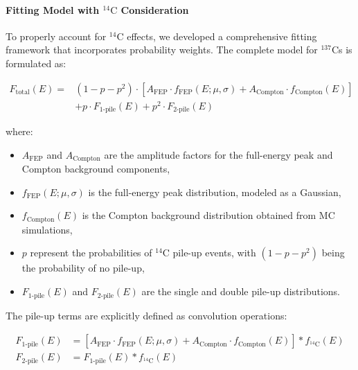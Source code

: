 \paragraph{Fitting Model with $^{14}\text{C}$ Consideration}
To properly account for $^{14}\text{C}$ effects, we developed a comprehensive fitting framework that incorporates probability weights. The complete model for $^{137}$Cs is formulated as:

\begin{equation}
\begin{aligned}
F_{\text{total}}(E) = & (1 - p - p^{2}) \cdot \left[ A_{\text{FEP}} \cdot f_{\text{FEP}}(E; \mu, \sigma) + A_{\text{Compton}} \cdot f_{\text{Compton}}(E) \right] \\
& + p \cdot F_{\text{1-pile}}(E) + p^{2} \cdot F_{\text{2-pile}}(E)
\end{aligned}
\label{eq:enhanced_fitting_model}
\end{equation}

where:
\begin{itemize}
    \item $A_{\text{FEP}}$ and $A_{\text{Compton}}$ are the amplitude factors for the full-energy peak and Compton background components,
    \item $f_{\text{FEP}}(E; \mu, \sigma)$ is the full-energy peak distribution, modeled as a Gaussian,
    \item $f_{\text{Compton}}(E)$ is the Compton background distribution obtained from MC simulations,
    \item $p$ represent the probabilities of $^{14}\text{C}$ pile-up events, with $(1 - p - p^{2})$ being the probability of no pile-up,
    \item $F_{\text{1-pile}}(E)$ and $F_{\text{2-pile}}(E)$ are the single and double pile-up distributions.
\end{itemize}

The pile-up terms are explicitly defined as convolution operations:

\begin{equation}
\begin{aligned}
F_{\text{1-pile}}(E) &= \left[ A_{\text{FEP}} \cdot f_{\text{FEP}}(E; \mu, \sigma) + A_{\text{Compton}} \cdot f_{\text{Compton}}(E) \right] \ast f_{\text{$^{14}$C}}(E) \\
F_{\text{2-pile}}(E) &= F_{\text{1-pile}}(E) \ast f_{\text{$^{14}$C}}(E)
\end{aligned}
\label{eq:convolution_definitions}
\end{equation}



